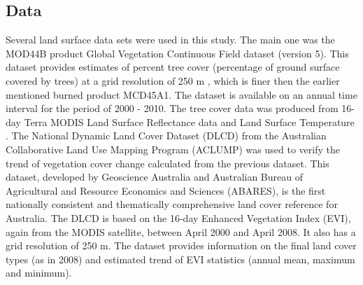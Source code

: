\documentclass[draft,linenumbers]{agujournal}
\begin{document}
\begin{article}
\section{Data}
\label{sec:Data}

Several land surface data sets were used in this study. The main one was the MOD44B product Global Vegetation Continuous Field dataset (version 5). This dataset provides estimates of percent tree cover (percentage of ground surface covered by trees) at a grid resolution of 250 m \citep{Townshend2011}, which is finer then the earlier mentioned burned product MCD45A1. The dataset is available on an annual time interval for the period of 2000 - 2010. The tree cover data was produced from 16-day Terra MODIS Land Surface Reflectance data and Land Surface Temperature \citep{Townshend2011}. The National Dynamic Land Cover Dataset (DLCD) \citep{Lymburner2010} from the Australian Collaborative Land Use Mapping Program (ACLUMP) was used to verify the trend of vegetation cover change calculated from the previous dataset. This dataset, developed by Geoscience Australia and Australian Bureau of Agricultural and Resource Economics and Sciences (ABARES), is the first nationally consistent and thematically comprehensive land cover reference for Australia. The DLCD is based on the 16-day Enhanced Vegetation Index (EVI), again from the MODIS satellite, between April 2000 and April 2008. It also has a grid resolution of 250 m. The dataset provides information on the final land cover types (as in 2008) and estimated trend of EVI statistics (annual mean, maximum and minimum). 

% 



\end{article}
\end{document}

